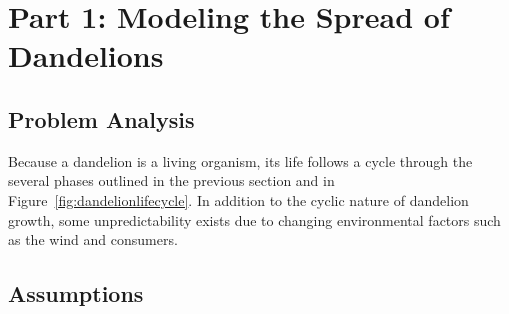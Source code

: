 \section{Part 1: Modeling the Spread of Dandelions}

\subsection{Problem Analysis}
Because a dandelion is a living organism, its life follows a cycle through the several phases outlined in the previous section and in Figure~\ref{fig:dandelionlifecycle}. In addition to the cyclic nature of dandelion growth, some unpredictability exists due to changing environmental factors such as the wind and consumers. 



\subsection {Assumptions}

